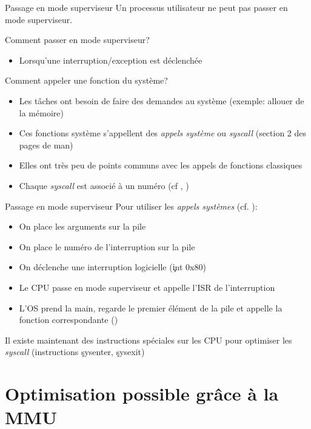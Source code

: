 \begin{frame}{Passage en mode superviseur}
  Un processus utilisateur ne peut pas passer en mode superviseur.

  Comment passer en mode superviseur?
  \begin{itemize}
  \item Lorsqu'une interruption/exception est déclenchée
  \end{itemize}

  Comment appeler une fonction du système?
  \begin{itemize}
  \item  Les  tâches ont  besoin  de  faire  des demandes  au  système
    (exemple: allouer de la mémoire)
  \item Ces fonctions système s'appellent des \emph{appels système} ou
    \emph{syscall} (section 2 des pages de man)
  \item  Elles ont  très  peu de  points  communs avec  les appels  de
    fonctions classiques
  \item   Chaque  \emph{syscall}   est   associé  à   un  numéro   (cf
     , )
  \end{itemize}

\end{frame}

\begin{frame}{Passage en mode superviseur}
  Pour utiliser les \emph{appels systèmes} (cf. ):
  \begin{itemize}
  \item On place les arguments sur la pile
  \item On place le numéro de l'interruption sur la pile
  \item On déclenche une interruption logicielle (\c{int 0x80})
  \item  Le  CPU  passe  en  mode  superviseur  et  appelle  l'ISR  de
    l'interruption
  \item L'OS prend  la main, regarde le premier élément  de la pile et
    appelle la fonction correspondante ()
  \end{itemize}
  Il  existe maintenant des  instructions spéciales  sur les  CPU pour
  optimiser    les    \emph{syscall}    (instructions    \c{sysenter},
  \c{sysexit})
\end{frame}

\section{Optimisation possible grâce à la MMU}

